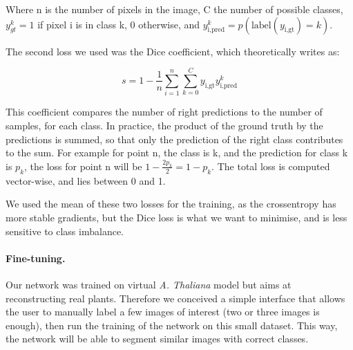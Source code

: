 Where n is the number of pixels in the image, C the number of possible
classes, $y_{gt}^k = 1$ if pixel i is in class k, 0 otherwise, and
$y_ {\textrm{i}, \textrm{pred}}^k = p(\textrm{label}(y_{\textrm{i},
\textrm{gt}}) = k)$.

The second loss we used was the Dice coefficient, which theoretically
writes as:

\begin{equation}
    s = 1 - \frac{1}{n}\sum_{i=1}^n\sum_{k=0}^{C}y_{\textrm{i},
    \textrm{gt}} y_{\textrm{i}, \textrm{pred}}^k
\end{equation}


This coefficient compares the number of right predictions to the
number of samples, for each class. In practice, the product of the
ground truth by the predictions is summed, so that only the prediction
of the right class contributes to the sum. For example for point n,
the class is k, and the prediction for class k is $p_k$, the loss
for point n will be $1 - \frac{2p_k}{2} = 1 - p_k$. The total loss
is computed vector-wise, and lies between 0 and 1.


We used the mean of these two losses for the training, as the
crossentropy has more stable gradients, but the Dice loss is what we
want to minimise, and is less sensitive to class imbalance.


\paragraph{Fine-tuning.} Our network was trained on virtual \emph{A.
Thaliana} model but aims at reconstructing real plants.  Therefore we
conceived a simple interface that allows the user to manually label a
few images of interest (two or three images is enough), then run the training
of the network on this small dataset. This way, the network will be
able to segment similar images with correct classes.


